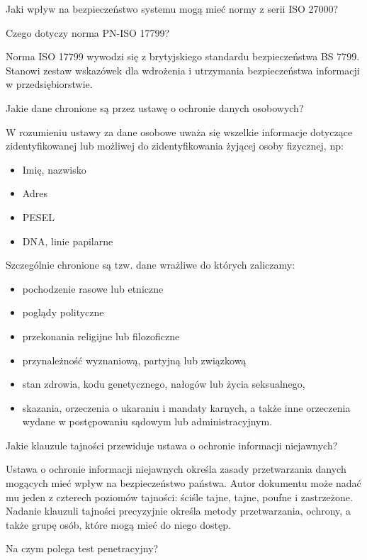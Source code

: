 \documentclass[answers,11pt]{exam}
\begin{document}
\begin{questions}
\question Jaki wpływ na bezpieczeństwo systemu mogą mieć normy z serii ISO 27000?

\question Czego dotyczy norma PN-ISO 17799?
\begin{solution}
Norma ISO 17799 wywodzi się z brytyjskiego standardu bezpieczeństwa BS 7799. Stanowi zestaw wskazówek dla wdrożenia i utrzymania bezpieczeństwa informacji w przedsiębiorstwie.
\end{solution}

\question Jakie dane chronione są przez ustawę o ochronie danych osobowych?
\begin{solution}
W rozumieniu ustawy za dane osobowe uważa się wszelkie informacje dotyczące zidentyfikowanej lub możliwej do zidentyfikowania żyjącej osoby fizycznej, np:
\begin{itemize}
\item Imię, nazwisko
\item Adres
\item PESEL
\item DNA, linie papilarne
\end{itemize}

Szczególnie chronione są tzw. dane wrażliwe do których zaliczamy:
\begin{itemize}
\item pochodzenie rasowe lub etniczne
\item poglądy polityczne
\item przekonania religijne lub filozoficzne
\item przynależność wyznaniową, partyjną lub związkową
\item stan zdrowia, kodu genetycznego, nałogów lub życia seksualnego,
\item skazania, orzeczenia o ukaraniu i mandaty karnych, a także inne orzeczenia wydane w postępowaniu sądowym lub administracyjnym.
\end{itemize}
\end{solution}


\question Jakie klauzule tajności przewiduje ustawa o ochronie informacji niejawnych?
\begin{solution}
Ustawa o ochronie informacji niejawnych określa zasady przetwarzania danych mogących mieć wpływ na bezpieczeństwo państwa. Autor dokumentu może nadać mu jeden z czterech poziomów tajności: ściśle tajne, tajne, poufne i zastrzeżone. Nadanie klauzuli tajności precyzyjnie określa metody przetwarzania, ochrony, a także grupę osób, które mogą mieć do niego dostęp. 
\end{solution}


\question Na czym polega test penetracyjny?


\end{questions}
\end{document}
